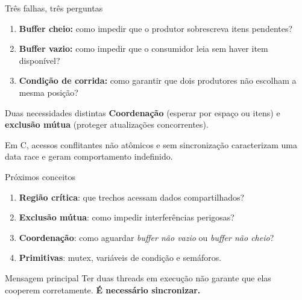 \documentclass[aspectratio=169,11pt]{beamer}
\begin{document}
\begin{frame}{Três falhas, três perguntas}
\begin{enumerate}
\setlength\itemsep{1em}
\item \textbf{Buffer cheio:} como impedir que o produtor sobrescreva itens pendentes?
\item \textbf{Buffer vazio:} como impedir que o consumidor leia sem haver item disponível?
\item \textbf{Condição de corrida:} como garantir que dois produtores não escolham a mesma posição?
\end{enumerate}
\vfill
\begin{block}{Duas necessidades distintas}
\textbf{Coordenação} (esperar por espaço ou itens) e \textbf{exclusão mútua} (proteger atualizações concorrentes).
\end{block}
\footnotesize\textcolor{cinza}{Em C, acessos conflitantes não atômicos e sem sincronização caracterizam uma data race e geram comportamento indefinido.}
\end{frame}

\begin{frame}{Próximos conceitos}
\begin{enumerate}
\setlength\itemsep{0.8em}
\item \textbf{Região crítica}: que trechos acessam dados compartilhados?
\item \textbf{Exclusão mútua}: como impedir interferências perigosas?
\item \textbf{Coordenação}: como aguardar \emph{buffer não vazio} ou \emph{buffer não cheio}?
\item \textbf{Primitivas}: mutex, variáveis de condição e semáforos.
\end{enumerate}
\vfill
\begin{block}{Mensagem principal}
Ter duas threads em execução não garante que elas cooperem corretamente. \textbf{É necessário sincronizar.}
\end{block}
\end{frame}

\end{document}
